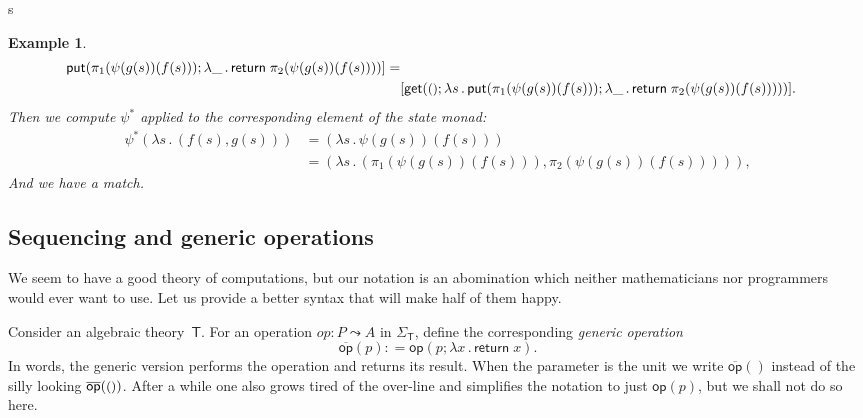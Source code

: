 s\documentclass{amsart}
\newcommand{\theory}[1]{\mathsf{#1}} %
\newcommand{\signature}[1]{\Sigma_{\theory{#1}}} %
\newcommand{\lam}[1]{\lambda #1 \,.\,}
\newcommand{\opdecl}[3]{#1 : #2 \leadsto #3} %
\newcommand{\unit}{{\text{\small$()$}}} %
\newcommand{\defeq}{\mathbin{{:}{=}}} %
\newcommand{\kode}[1]{\mathsf{#1}}
\newcommand{\xopgen}[2]{\overline{#1}(#2)}
\newcommand{\opgen}[2]{\xopgen{\kode{#1}}{#2}}
\newcommand{\opcall}[3]{\kode{#1}(#2; #3)}
\newcommand{\return}[1]{\kode{return}\;#1}
\newtheorem{example}[definition]{Example}
\begin{document}
\begin{example}
\begin{align*}
{{      \opcall{put}{\pi_1 (\psi(g(s))(f(s)))}{\lam{\_} \return{\pi_2 (\psi(g(s))(f(s)))}}
    }}] = \\
    &[\opcall{get}{\unit}{\lam{s}
      \opcall{put}{\pi_1 (\psi(g(s))(f(s)))}{\lam{\_} \return{\pi_2 (\psi(g(s))(f(s)))}}
    }].
  \end{align*}
  Then we compute $\psi^{*}$ applied to the corresponding element of the state monad:
  \begin{align*}
    \psi^{*}(\lam{s} (f(s), g(s)))
    &= (\lam{s} \psi(g(s))(f(s))) \\
    &= (\lam{s} (\pi_1 (\psi(g(s))(f(s))), \pi_2 (\psi(g(s))(f(s))))),
  \end{align*}
  And we have a match.
\end{example}


\subsection{Sequencing and generic operations}
\label{sec:sequ-gener-oper}

We seem to have a good theory of computations, but our notation is an
abomination which neither mathematicians nor programmers would ever want to use.
Let us provide a better syntax that will make half of them happy.

Consider an algebraic theory~$\theory{T}$. For an operation $\opdecl{op}{P}{A}$
in $\signature{T}$, define the corresponding \emph{generic operation}
%
\begin{equation*}
  \opgen{op}{p} \defeq \opcall{op}{p}{\lam{x} \return{x}}.
\end{equation*}
%
In words, the generic version performs the operation and returns its result.
When the parameter is the unit we write $\opgen{op}{}$ instead of the silly
looking $\opgen{op}{\unit}$. After a while one also grows tired of the over-line
and simplifies the notation to just $\kode{op}(p)$, but we shall not do so here.
\end{document}
